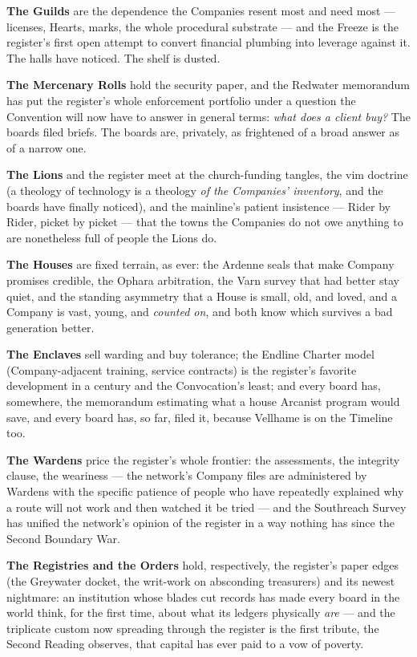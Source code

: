\textbf{The Guilds} are the dependence the Companies resent most and need most --- licenses, Hearts, marks, the whole procedural substrate --- and the Freeze is the register's first open attempt to convert financial plumbing into leverage against it. The halls have noticed. The shelf is dusted.

\textbf{The Mercenary Rolls} hold the security paper, and the Redwater memorandum has put the register's whole enforcement portfolio under a question the Convention will now have to answer in general terms: \textit{what does a client buy?} The boards filed briefs. The boards are, privately, as frightened of a broad answer as of a narrow one.

\textbf{The Lions} and the register meet at the church-funding tangles, the vim doctrine (a theology of technology is a theology \textit{of the Companies' inventory}, and the boards have finally noticed), and the mainline's patient insistence --- Rider by Rider, picket by picket --- that the towns the Companies do not owe anything to are nonetheless full of people the Lions do.

\textbf{The Houses} are fixed terrain, as ever: the Ardenne seals that make Company promises credible, the Ophara arbitration, the Varn survey that had better stay quiet, and the standing asymmetry that a House is small, old, and loved, and a Company is vast, young, and \textit{counted on}, and both know which survives a bad generation better.

\textbf{The Enclaves} sell warding and buy tolerance; the Endline Charter model (Company-adjacent training, service contracts) is the register's favorite development in a century and the Convocation's least; and every board has, somewhere, the memorandum estimating what a house Arcanist program would save, and every board has, so far, filed it, because Vellhame is on the Timeline too.

\textbf{The Wardens} price the register's whole frontier: the assessments, the integrity clause, the weariness --- the network's Company files are administered by Wardens with the specific patience of people who have repeatedly explained why a route will not work and then watched it be tried --- and the Southreach Survey has unified the network's opinion of the register in a way nothing has since the Second Boundary War.

\textbf{The Registries and the Orders} hold, respectively, the register's paper edges (the Greywater docket, the writ-work on absconding treasurers) and its newest nightmare: an institution whose blades cut records has made every board in the world think, for the first time, about what its ledgers physically \textit{are} --- and the triplicate custom now spreading through the register is the first tribute, the Second Reading observes, that capital has ever paid to a vow of poverty.

